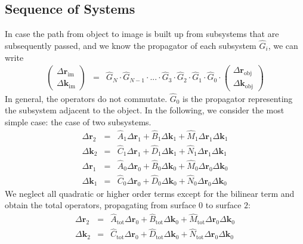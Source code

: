 \documentclass[12pt,a4paper,twoside,openright,BCOR10mm,headsepline,titlepage,abstracton,chapterprefix,final]{scrreprt}
\newcommand\Vector[1]{{\mathbf{#1}}}
\newcommand\wavenumber{k}
\newcommand\Wavevector{\Vector{\wavenumber}}
\newcommand\im{\textrm{im}}
\newcommand\obj{\textrm{obj}}
\newcommand\tot{\textrm{tot}}
\begin{document}
\subsection{Sequence of Systems}
In case the path from object to image is built up from subsystems that are subsequently passed, 
and we know the propagator of each subsystem $\hat{G}_i$,
we can write
\begin{eqnarray}
 \begin{pmatrix}
  \Delta \Vector{r}_\im \\ \Delta \Wavevector_\im
 \end{pmatrix}
 &=&
 \hat{G}_N \cdot \hat{G}_{N-1} \cdot ... \cdot \hat{G}_3 \cdot \hat{G}_2 \cdot \hat{G}_1 \cdot \hat{G}_0 \cdot
 \begin{pmatrix}
  \Delta \Vector{r}_\obj \\ \Delta \Wavevector_\obj
 \end{pmatrix}
\end{eqnarray}
In general, the operators do not commutate. $\hat{G}_0$ is the propagator representing the subsystem adjacent to the object.
In the following, we consider the most simple case: the case of two subsystems.
\begin{eqnarray}
 \Delta \Vector{r}_2  &=& \hat{A}_1 \Delta \Vector{r}_1 + \hat{B}_1 \Delta \Vector{k}_1 + \hat{M}_1 \Delta \Vector{r}_1 \Delta \Vector{k}_1 \\ 
 \Delta \Wavevector_2 &=& \hat{C}_1 \Delta \Vector{r}_1 + \hat{D}_1 \Delta \Vector{k}_1 + \hat{N}_1 \Delta \Vector{r}_1 \Delta \Vector{k}_1 \\
 \Delta \Vector{r}_1  &=& \hat{A}_0 \Delta \Vector{r}_0 + \hat{B}_0 \Delta \Vector{k}_0 + \hat{M}_0 \Delta \Vector{r}_0 \Delta \Vector{k}_0 \\ 
 \Delta \Wavevector_1 &=& \hat{C}_0 \Delta \Vector{r}_0 + \hat{D}_0 \Delta \Vector{k}_0 + \hat{N}_0 \Delta \Vector{r}_0 \Delta \Vector{k}_0
\end{eqnarray}
We neglect all quadratic or higher order terms except for the bilinear term and obtain the total operators, 
propagating from surface $0$ to surface $2$:
\begin{subequations}
\begin{eqnarray}
 \Delta \Vector{r}_2  &=& \hat{A}_\tot \Delta \Vector{r}_0 + \hat{B}_\tot \Delta \Vector{k}_0 + \hat{M}_\tot \Delta \Vector{r}_0 \Delta \Vector{k}_0 \\ 
 \Delta \Wavevector_2 &=& \hat{C}_\tot \Delta \Vector{r}_0 + \hat{D}_\tot \Delta \Vector{k}_0 + \hat{N}_\tot \Delta \Vector{r}_0 \Delta \Vector{k}_0
\end{eqnarray}
\end{subequations}
\end{document}
